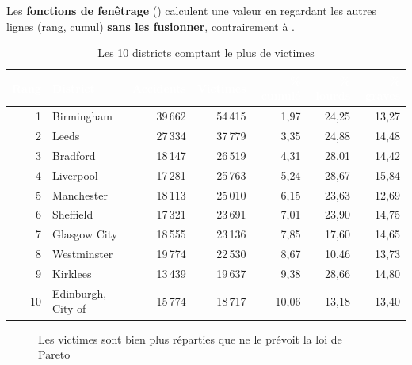 \documentclass[11pt,a4paper]{report}
\newcommand{\hd}[1]{\textcolor{white}{\bfseries #1}}
\newcommand{\headrow}{\rowcolor{primary}}
\newcommand{\code}[1]{\texttt{\detokenize{#1}}}
\begin{document}
Les \textbf{fonctions de fenêtrage} (\code{OVER}) calculent une valeur en regardant les autres lignes (rang, cumul) \textbf{sans les fusionner}, contrairement à \code{GROUP BY}.

\begin{table}[H]
\centering
\small
{}
\begin{tabular}{@{}r l r r r r r@{}}
\toprule
\headrow \hd{Rang} & \hd{District} & \hd{Accidents} & \hd{Victimes} & \hd{\% cumulé} & \hd{\% lourds} & \hd{\% graves} \\
\midrule
1 & Birmingham & 39\,662 & 54\,415 & 1,97 & 24,25 & 13,27 \\
2 & Leeds & 27\,334 & 37\,779 & 3,35 & 24,88 & 14,48 \\
3 & Bradford & 18\,147 & 26\,519 & 4,31 & 28,01 & 14,42 \\
4 & Liverpool & 17\,281 & 25\,763 & 5,24 & 28,67 & 15,84 \\
5 & Manchester & 18\,113 & 25\,010 & 6,15 & 23,63 & 12,69 \\
6 & Sheffield & 17\,321 & 23\,691 & 7,01 & 23,90 & 14,75 \\
7 & Glasgow City & 18\,555 & 23\,136 & 7,85 & 17,60 & 14,65 \\
8 & Westminster & 19\,774 & 22\,530 & 8,67 & 10,46 & 13,73 \\
9 & Kirklees & 13\,439 & 19\,637 & 9,38 & 28,66 & 14,80 \\
10 & Edinburgh, City of & 15\,774 & 18\,717 & 10,06 & 13,18 & 13,40 \\
\bottomrule
\end{tabular}
\caption{Les 10 districts comptant le plus de victimes}
\end{table}

\begin{figure}[H]
\centering
{}
\caption{Les victimes sont bien plus réparties que ne le prévoit la loi de Pareto}
\end{figure}
\end{document}
